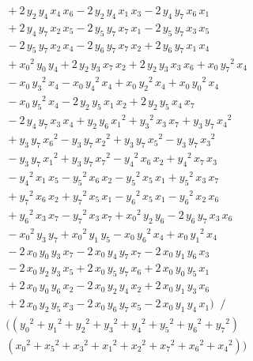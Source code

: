 \documentclass[a4paper,12pt]{book}
\begin{document}
\begin{eqnarray*}
&&\mbox{}+2\,{y_{2}}\,{y_{4}}\,{x_{4}}\,{x_{6}}-2\,{y_{2}}\,{y_{4}}\,{x_{1}}%
\,{x_{3}}-2\,{y_{4}}\,{y_{7}}\,{x_{6}}\,{x_{1}} \\
&&\mbox{}+2\,{y_{4}}\,{y_{7}}\,{x_{2}}\,{x_{5}}-2\,{y_{5}}\,{y_{7}}\,{x_{7}}%
\,{x_{1}}-2\,{y_{5}}\,{y_{7}}\,{x_{3}}\,{x_{5}} \\
&&\mbox{}-2\,{y_{5}}\,{y_{7}}\,{x_{2}}\,{x_{4}}-2\,{y_{6}}\,{y_{7}}\,{x_{7}}%
\,{x_{2}}+2\,{y_{6}}\,{y_{7}}\,{x_{1}}\,{x_{4}} \\
&&\mbox{}+{x_{0}}^{2}\,{y_{0}}\,{y_{4}}+2\,{y_{2}}\,{y_{3}}\,{x_{7}}\,{x_{2}}%
+2\,{y_{2}}\,{y_{3}}\,{x_{3}}\,{x_{6}}+{x_{0}}\,{y_{7}}^{2}\,{x_{4}} \\
&&\mbox{}-{x_{0}}\,{y_{3}}^{2}\,{x_{4}}-{x_{0}}\,{y_{4}}^{2}\,{x_{4}}+{x_{0}}%
\,{y_{2}}^{2}\,{x_{4}}+{x_{0}}\,{y_{0}}^{2}\,{x_{4}} \\
&&\mbox{}-{x_{0}}\,{y_{5}}^{2}\,{x_{4}}-2\,{y_{2}}\,{y_{5}}\,{x_{1}}\,{x_{2}}%
+2\,{y_{2}}\,{y_{5}}\,{x_{4}}\,{x_{7}} \\
&&\mbox{}-2\,{y_{4}}\,{y_{7}}\,{x_{3}}\,{x_{4}}+{y_{2}}\,{y_{6}}\,{x_{1}}%
^{2}+{y_{3}}^{2}\,{x_{3}}\,{x_{7}}+{y_{3}}\,{y_{7}}\,{x_{4}}^{2} \\
&&\mbox{}+{y_{3}}\,{y_{7}}\,{x_{6}}^{2}-{y_{3}}\,{y_{7}}\,{x_{2}}^{2}+{y_{3}}%
\,{y_{7}}\,{x_{5}}^{2}-{y_{3}}\,{y_{7}}\,{x_{3}}^{2} \\
&&\mbox{}-{y_{3}}\,{y_{7}}\,{x_{1}}^{2}+{y_{3}}\,{y_{7}}\,{x_{7}}^{2}-{y_{4}}%
^{2}\,{x_{6}}\,{x_{2}}+{y_{4}}^{2}\,{x_{7}}\,{x_{3}} \\
&&\mbox{}-{y_{4}}^{2}\,{x_{1}}\,{x_{5}}-{y_{5}}^{2}\,{x_{6}}\,{x_{2}}-{y_{5}}%
^{2}\,{x_{5}}\,{x_{1}}+{y_{5}}^{2}\,{x_{3}}\,{x_{7}} \\
&&\mbox{}+{y_{7}}^{2}\,{x_{6}}\,{x_{2}}+{y_{7}}^{2}\,{x_{5}}\,{x_{1}}-{y_{6}}%
^{2}\,{x_{5}}\,{x_{1}}-{y_{6}}^{2}\,{x_{2}}\,{x_{6}} \\
&&\mbox{}+{y_{6}}^{2}\,{x_{3}}\,{x_{7}}-{y_{7}}^{2}\,{x_{3}}\,{x_{7}}+{x_{0}}%
^{2}\,{y_{2}}\,{y_{6}}-2\,{y_{6}}\,{y_{7}}\,{x_{3}}\,{x_{6}} \\
&&\mbox{}-{x_{0}}^{2}\,{y_{3}}\,{y_{7}}+{x_{0}}^{2}\,{y_{1}}\,{y_{5}}-{x_{0}}%
\,{y_{6}}^{2}\,{x_{4}}+{x_{0}}\,{y_{1}}^{2}\,{x_{4}} \\
&&\mbox{}-2\,{x_{0}}\,{y_{0}}\,{y_{3}}\,{x_{7}}-2\,{x_{0}}\,{y_{4}}\,{y_{7}}%
\,{x_{7}}-2\,{x_{0}}\,{y_{1}}\,{y_{6}}\,{x_{3}} \\
&&\mbox{}-2\,{x_{0}}\,{y_{2}}\,{y_{3}}\,{x_{5}}+2\,{x_{0}}\,{y_{5}}\,{y_{7}}%
\,{x_{6}}+2\,{x_{0}}\,{y_{0}}\,{y_{5}}\,{x_{1}} \\
&&\mbox{}+2\,{x_{0}}\,{y_{0}}\,{y_{6}}\,{x_{2}}-2\,{x_{0}}\,{y_{2}}\,{y_{4}}%
\,{x_{2}}+2\,{x_{0}}\,{y_{1}}\,{y_{3}}\,{x_{6}} \\
&&\mbox{}+2\,{x_{0}}\,{y_{2}}\,{y_{5}}\,{x_{3}}-2\,{x_{0}}\,{y_{6}}\,{y_{7}}%
\,{x_{5}}-2\,{x_{0}}\,{y_{1}}\,{y_{4}}\,{x_{1}})\!\;\;/\;\; \\
&&\mbox{}(({y_{0}}^{2}+{y_{1}}^{2}+{y_{2}}^{2}+{y_{3}}^{2}+{y_{4}}^{2}+{y_{5}%
}^{2}+{y_{6}}^{2}+{y_{7}}^{2}) \\
&&\mbox{}({x_{0}}^{2}+{x_{5}}^{2}+{x_{3}}^{2}+{x_{1}}^{2}+{x_{2}}^{2}+{x_{7}}%
^{2}+{x_{6}}^{2}+{x_{4}}^{2}))\!\!
\end{eqnarray*}
\end{document}
